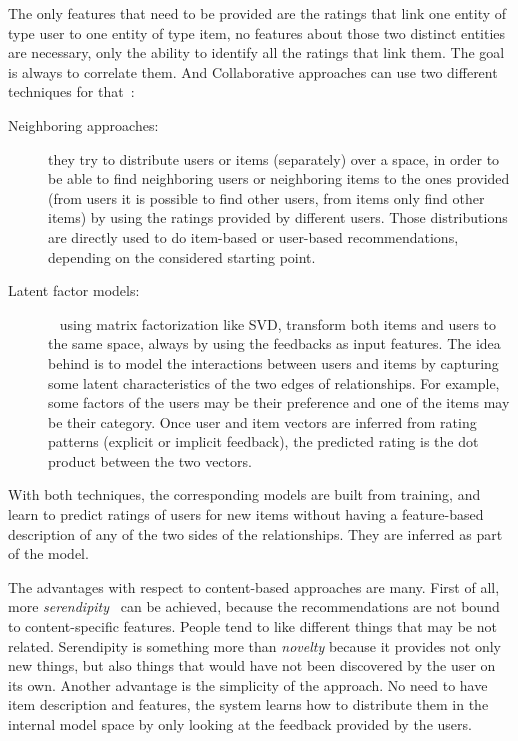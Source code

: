 The only features that need to be provided are the ratings that link one entity of type user to one entity of type item, no features about those two distinct entities are necessary, only the ability to identify all the ratings that link them. The goal is always to correlate them. And Collaborative approaches can use two different techniques for that~\cite{koren2015advances}:

\begin{description}
	\item[Neighboring approaches:] they try to distribute users or items (separately) over a space, in order to be able to find neighboring users or neighboring items to the ones provided (from users it is possible to find other users, from items only find other items) by using the ratings provided by different users. Those distributions are directly used to do item-based or user-based recommendations, depending on the considered starting point.
	\item[Latent factor models:]~\cite{koren2009matrix} using matrix factorization like SVD, transform both items and users to the same space, always by using the feedbacks as input features. The idea behind is to model the interactions between users and items by capturing some latent characteristics of the two edges of relationships. For example, some factors of the users may be their preference and one of the items may be their category. Once user and item vectors are inferred from rating patterns (explicit or implicit feedback), the predicted rating is the dot product between the two vectors.
\end{description}
With both techniques, the corresponding models are built from training, and learn to predict ratings of users for new items without having a feature-based description of any of the two sides of the relationships. They are inferred as part of the model.

The advantages with respect to content-based approaches are many. First of all, more \textit{serendipity}~\cite{roberts1989serendipity} can be achieved, because the recommendations are not bound to content-specific features. People tend to like different things that may be not related. Serendipity is something more than \textit{novelty} because it provides not only new things, but also things that would have not been discovered by the user on its own. Another advantage is the simplicity of the approach. No need to have item description and features, the system learns how to distribute them in the internal model space by only looking at the feedback provided by the users.

